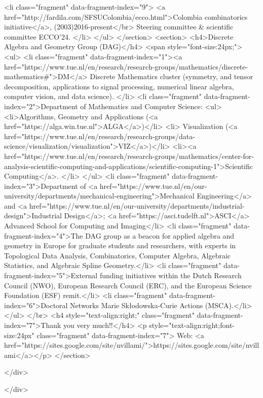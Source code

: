 <li class="fragment" data-fragment-index="9"> <a href="http://fardila.com/SFSUColombia/ecco.html">Colombia combinatorics initiative</a>, (2003)2016-present</br>
Steering committee & scientific committee ECCO'24.
</li>
</ul>
</section>
<section> 
<h4>Discrete Algebra and Geometry Group (DAG)</h4>
<span style="font-size:24px;"> 
<ul>
<li class="fragment" data-fragment-index="1"><a href="https://www.tue.nl/en/research/research-groups/mathematics/discrete-mathematics#">DM</a> Discrete Mathematics cluster (symmetry, and tensor decomposition, applications to signal processing, numerical linear algebra, computer vision, and data science).	</li>
<li class="fragment"  data-fragment-index="2">Department of Mathematics and Computer Science:
<ul>
	<li>Algorithms, Geometry and Applications (<a href="https://alga.win.tue.nl">ALGA</a>)</li>
		<li> Visualization (<a href="https://www.tue.nl/en/research/research-groups/data-science/visualization/visualization">VIZ</a>)</li>
		<li><a href="https://www.tue.nl/en/research/research-groups/mathematics/center-for-analysis-scientific-computing-and-applications/scientific-computing-1">Scientific Computing</a>.
</li>
</ul>		
<li class="fragment" data-fragment-index="3">Department of <a href="https://www.tue.nl/en/our-university/departments/mechanical-engineering">Mechanical Engineering</a> and <a href="https://www.tue.nl/en/our-university/departments/industrial-design">Industrial Design</a>; <a href="https://asci.tudelft.nl">ASCI</a> Advanced School for Computing and Imaging</li>
<li class="fragment" data-fragment-index="4">The DAG group as a beacon for
	applied algebra and geometry in Europe for graduate students and researchers, with experts in Topological
	Data Analysis, Combinatorics, Computer Algebra, Algebraic Statistics, and
	Algebraic Spline Geometry.</li>
<li  class="fragment" data-fragment-index="5">External funding initiatives within the Dutch Research Council (NWO), European Research Council (ERC), and the European Science Foundation (ESF) remit.</li>
<li class="fragment" data-fragment-index="6">Doctoral Networks Marie Skłodowska-Curie Actions (MSCA).</li>	
</ul>
</br>
<h4 style="text-align:right;" class="fragment" data-fragment-index="7">Thank you very much!!</h4>
<p style="text-align:right;font-size:24px" class="fragment" data-fragment-index="7"> Web: <a href="https://sites.google.com/site/nvillami/">https://sites.google.com/site/nvillami</a></p>  
</section>

</div>

  </div>

